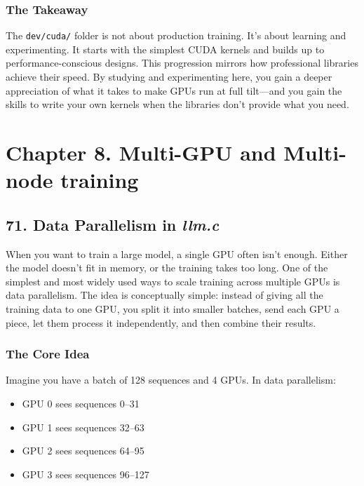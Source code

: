 \documentclass[
  letterpaper,
  DIV=11,
  numbers=noendperiod]{scrreprt}
\providecommand{\tightlist}{%
  \setlength{\itemsep}{0pt}\setlength{\parskip}{0pt}}
\begin{document}
\subsubsection{The Takeaway}\label{the-takeaway-59}

The \texttt{dev/cuda/} folder is not about production training. It's
about learning and experimenting. It starts with the simplest CUDA
kernels and builds up to performance-conscious designs. This progression
mirrors how professional libraries achieve their speed. By studying and
experimenting here, you gain a deeper appreciation of what it takes to
make GPUs run at full tilt---and you gain the skills to write your own
kernels when the libraries don't provide what you need.

\section{Chapter 8. Multi-GPU and Multi-node
training}\label{chapter-8.-multi-gpu-and-multi-node-training}

\subsection{\texorpdfstring{71. Data Parallelism in
\emph{llm.c}}{71. Data Parallelism in llm.c}}\label{data-parallelism-in-llm.c}

When you want to train a large model, a single GPU often isn't enough.
Either the model doesn't fit in memory, or the training takes too long.
One of the simplest and most widely used ways to scale training across
multiple GPUs is data parallelism. The idea is conceptually simple:
instead of giving all the training data to one GPU, you split it into
smaller batches, send each GPU a piece, let them process it
independently, and then combine their results.

\subsubsection{The Core Idea}\label{the-core-idea-3}

Imagine you have a batch of 128 sequences and 4 GPUs. In data
parallelism:

\begin{itemize}
\tightlist
\item
  GPU 0 sees sequences 0--31
\item
  GPU 1 sees sequences 32--63
\item
  GPU 2 sees sequences 64--95
\item
  GPU 3 sees sequences 96--127
\end{itemize}
\end{document}
